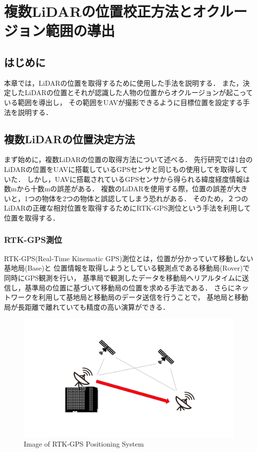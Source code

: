 \documentclass[autodetect-engine,dvipdfmx-if-dvi,ja=standard,a4j,jbase=11pt,magstyle=nomag*]{bxjsreport}
\begin{document}
\chapter{複数LiDARの位置校正方法とオクルージョン範囲の導出}
	
\section{はじめに}
本章では，LiDARの位置を取得するために使用した手法を説明する．
また，決定したLiDARの位置とそれが認識した人物の位置からオクルージョンが起こっている範囲を導出し，
その範囲をUAVが撮影できるように目標位置を設定する手法を説明する．

\section{複数LiDARの位置決定方法}
まず始めに，複数LiDARの位置の取得方法について述べる．
先行研究では1台のLiDARの位置をUAVに搭載しているGPSセンサと同じもの使用してを取得していた．
しかし，UAVに搭載されているGPSセンサから得られる緯度経度情報は数mから十数mの誤差がある．
複数のLiDARを使用する際，位置の誤差が大きいと，1つの物体を2つの物体と誤認してしまう恐れがある．
そのため，２つのLiDARの正確な相対位置を取得するためにRTK-GPS測位という手法を利用して位置を取得する．

\subsection{RTK-GPS測位}
RTK-GPS(Real-Time Kinematic GPS)測位とは，位置が分かっていて移動しない基地局(Base)と
位置情報を取得しようとしている観測点である移動局(Rover)で同時にGPS観測を行い，
基準局で観測したデータを移動局へリアルタイムに送信し，基準局の位置に基づいて移動局の位置を求める手法である．
さらにネットワークを利用して基地局と移動局のデータ送信を行うことで，
基地局と移動局が長距離で離れていても精度の高い演算ができる．

\begin{figure}[t]
    \centering
    \includegraphics[width=\linewidth, clip]{./figure/chapter3/RTK.png}
    \caption{Image of RTK-GPS Positioning System}
    \label{fig:RTK}
\end{figure}
\end{document}
